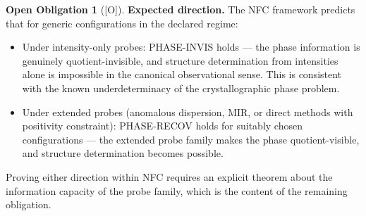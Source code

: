 \documentclass[12pt,oneside]{amsbook}
\theoremstyle{plain}
\theoremstyle{definition}
\newtheorem{obligation}[theorem]{Open Obligation}
\theoremstyle{remark}
\newcommand{\status}[1]{\textup{[#1]}}
\begin{document}
\begin{obligation}[\status{O}]
\textbf{Expected direction.} The NFC framework predicts that
for generic configurations in the declared regime:
\begin{itemize}
  \item Under intensity-only probes: PHASE-INVIS holds ---
    the phase information is genuinely quotient-invisible, and
    structure determination from intensities alone is impossible
    in the canonical observational sense.  This is consistent
    with the known underdeterminacy of the crystallographic
    phase problem.
  \item Under extended probes (anomalous dispersion, MIR, or
    direct methods with positivity constraint): PHASE-RECOV
    holds for suitably chosen configurations ---
    the extended probe family makes the phase quotient-visible,
    and structure determination becomes possible.
\end{itemize}
Proving either direction within NFC requires an explicit theorem
about the information capacity of the probe family, which is the
content of the remaining obligation.
\end{obligation}
\end{document}
